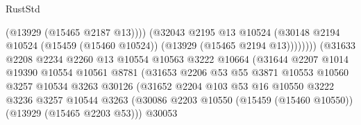 \begin{lexlean}{RustStd}
\begin{coremodule}
                                              (@13929 (@15465 @2187 @13))))
                                          (@32043
                                            @2195
                                            @13
                                            @10524
                                            (@30148
                                              @2194
                                              @10524
                                              (@15459 (@15460 @10524))
                                              (@13929 (@15465 @2194 @13))))))))
                                  (@31633
                                    @2208
                                    @2234
                                    @2260
                                    @13
                                    @10554
                                    @10563
                                    @3222
                                    @10664
                                    (@31644
                                      @2207
                                      @1014
                                      @19390
                                      @10554
                                      @10561
                                      @8781
                                      (@31653
                                        @2206
                                        @53
                                        @55
                                        @3871
                                        @10553
                                        @10560
                                        @3257
                                        @10534
                                        @3263
                                        @30126
                                        (@31652
                                          @2204
                                          @103
                                          @53
                                          @16
                                          @10550
                                          @3222
                                          @3236
                                          @3257
                                          @10544
                                          @3263
                                          (@30086
                                            @2203
                                            @10550
                                            (@15459 (@15460 @10550))
                                            (@13929 (@15465 @2203 @53)))
                                          @30053

\end{coremodule}
\end{lexlean}
